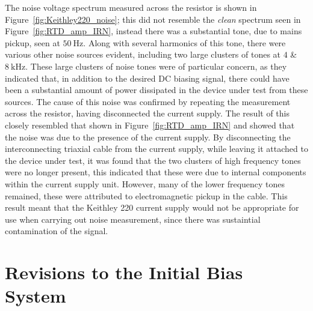\par
The noise voltage spectrum measured across the resistor is shown in Figure~\ref{fig:Keithley220_noise}; this did not resemble the \textit{clean} spectrum seen in Figure~\ref{fig:RTD_amp_IRN}, instead there was a substantial tone, due to mains pickup, seen at $50~\mathrm{Hz}$. Along with several harmonics of this tone, there were various other noise sources evident, including two large clusters of tones at $4$ \& $8~\mathrm{kHz}$. These large clusters of noise tones were of particular concern, as they indicated that, in addition to the desired DC biasing signal, there could have been a substantial amount of power dissipated in the device under test from these sources. The cause of this noise was confirmed by repeating the measurement across the resistor, having disconnected the current supply. The result of this closely resembled that shown in Figure~\ref{fig:RTD_amp_IRN} and showed that the noise was due to the presence of the current supply. By disconnecting the interconnecting triaxial cable from the current supply, while leaving it attached to the device under test, it was found that the two clusters of high frequency tones were no longer present, this indicated that these were due to internal components within the current supply unit. However, many of the lower frequency tones remained, these were attributed to electromagnetic pickup in the cable. This result meant that the Keithley 220 current supply would not be appropriate for use when carrying out noise measurement, since there was sustaintial contamination of the signal.

\section{Revisions to the Initial Bias System} \label{sec:RTD_bias}
